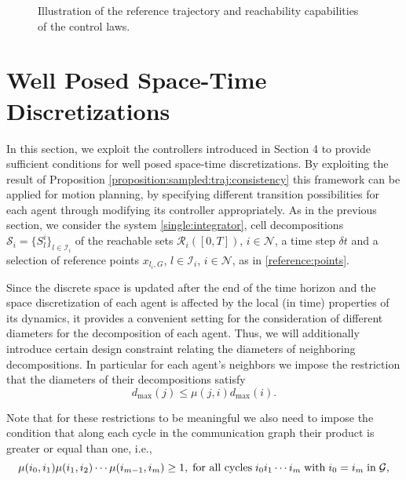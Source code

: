 \documentclass[reqno]{amsart}
\theoremstyle{plain}
\theoremstyle{definition}
\numberwithin{equation}{section}
\begin{document}
\begin{figure}[H]
\begin{center}
\vspace{-0.4cm}

\end{center}
\caption{Illustration of the reference trajectory and reachability capabilities of the control laws.} \label{fig:controllers}
\end{figure}

\section{Well Posed Space-Time Discretizations}

In this section, we exploit the controllers introduced in Section 4 to provide sufficient conditions for well posed space-time discretizations. By exploiting the result of Proposition \ref{proposition:sampled:traj:consistency} this  framework can be applied for motion planning, by specifying different transition possibilities for each agent through modifying its controller appropriately. As in the previous section, we consider the system \eqref{single:integrator}, cell decompositions $\mathcal{S}_i=\{S_l^i\}_{l\in{\ensuremath{\mathcal{I}}}_i}$ of the reachable sets ${\ensuremath{\mathcal{R}}}_i([0,T])$, $i\in{\ensuremath{\mathcal{N}}}$, a time step $\delta t$ and a selection of reference points $x_{l_i,G}$, $l\in{\ensuremath{\mathcal{I}}}_i$, $i\in{\ensuremath{\mathcal{N}}}$, as in \eqref{reference:points}.

Since the discrete space is updated after the end of the time horizon and the space discretization of each agent is affected by the local (in time) properties of its dynamics, it provides a convenient setting for the consideration of different diameters for the decomposition of each agent. Thus, we will additionally introduce certain design constraint relating the diameters of neighboring decompositions. In particular for each agent's neighbors we impose the restriction that the diameters of their decompositions satisfy  
\begin{equation} \label{diameters:restrictions}
d_{\max}(j)\le \mu(j,i) d_{\max}(i). 
\end{equation}

\noindent Note that for these restrictions to be meaningful we also need to impose the condition that along each cycle in the communication graph their product is greater or equal than one, i.e., 
\begin{equation} \label{diameters:restrictions:consistency}
\mu(i_0,i_1)\mu(i_1,i_2)\cdots\mu(i_{m-1},i_m)\ge 1,\;\textup{for all cycles} \;i_0i_1\cdots i_m\;{\rm with}\;i_0=i_m \;{\rm in}\; \mathcal{G},
\end{equation}
\end{document}
